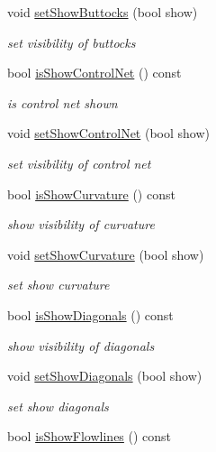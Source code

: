 \begin{DoxyCompactItemize}
void \hyperlink{classShipCAD_1_1Visibility_a8e7776fdc776e8fa96b7e9bce1cffdce}{set\+Show\+Buttocks} (bool show)
\begin{DoxyCompactList}\small\item\em set visibility of buttocks \end{DoxyCompactList}\item 
bool \hyperlink{classShipCAD_1_1Visibility_a177cc880657723c1cbcc4c66c16ee208}{is\+Show\+Control\+Net} () const 
\begin{DoxyCompactList}\small\item\em is control net shown \end{DoxyCompactList}\item 
void \hyperlink{classShipCAD_1_1Visibility_a7498435ee6955772713b113a63279260}{set\+Show\+Control\+Net} (bool show)
\begin{DoxyCompactList}\small\item\em set visibility of control net \end{DoxyCompactList}\item 
bool \hyperlink{classShipCAD_1_1Visibility_a36f2e03d75a5a2cfcfc3c637c08bee92}{is\+Show\+Curvature} () const 
\begin{DoxyCompactList}\small\item\em show visibility of curvature \end{DoxyCompactList}\item 
void \hyperlink{classShipCAD_1_1Visibility_a72fa3ed8c721fffe65b29c61329a1d35}{set\+Show\+Curvature} (bool show)
\begin{DoxyCompactList}\small\item\em set show curvature \end{DoxyCompactList}\item 
bool \hyperlink{classShipCAD_1_1Visibility_afa9ae51a7f178d93fe7d6b12ea5a4e63}{is\+Show\+Diagonals} () const 
\begin{DoxyCompactList}\small\item\em show visibility of diagonals \end{DoxyCompactList}\item 
void \hyperlink{classShipCAD_1_1Visibility_a02ff571862dacdbec3248a80ec42eb4f}{set\+Show\+Diagonals} (bool show)
\begin{DoxyCompactList}\small\item\em set show diagonals \end{DoxyCompactList}\item 
bool \hyperlink{classShipCAD_1_1Visibility_a39e12b36d20e2e3ad750e18c248a04f5}{is\+Show\+Flowlines} () const 

\end{DoxyCompactItemize}
